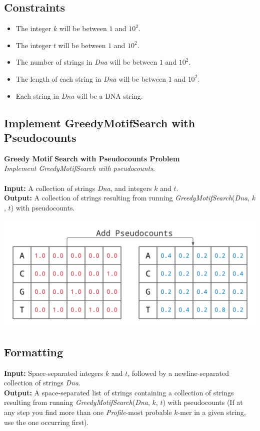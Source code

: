 \documentclass{article}
\begin{document}
\subsection*{Constraints}
\begin{itemize}
    \item The integer $k$ will be between $1$ and $10^2$.
    \item The integer $t$ will be between $1$ and $10^2$.
    \item The number of strings in \emph{Dna} will be between $1$ and $10^2$.
    \item The length of each string in \emph{Dna} will be between $1$ and $10^2$.
    \item Each string in \emph{Dna} will be a DNA string.
\end{itemize}
\pagebreak
\subsection{Implement GreedyMotifSearch with Pseudocounts}
\hline\vspace{5}
\noindent\textbf{Greedy Motif Search with Pseudocounts Problem}\\
\emph{Implement GreedyMotifSearch with pseudocounts}.\\ \\
\textbf{Input:} A collection of strings \emph{Dna}, and integers $k$ and $t$.\\
\textbf{Output:} A collection of strings resulting from running \emph{GreedyMotifSearch}(\emph{Dna}, $k$, $t$) with pseudocounts.
\begin{center}
    \includegraphics[scale=0.2]{c2/logos/2E.png} 
\end{center}
\hline\vspace{5}

\subsection*{Formatting}
\textbf{Input:} Space-separated integers $k$ and $t$, followed by a newline-separated collection of strings \emph{Dna}.\\
\noindent\textbf{Output:} A space-separated list of strings containing a collection of strings resulting from running \emph{GreedyMotifSearch}(\emph{Dna}, $k$, $t$) with pseudocounts (If at any step you find more than one \emph{Profile}-most probable $k$-mer in a given string, use the one occurring first).
\end{document}
